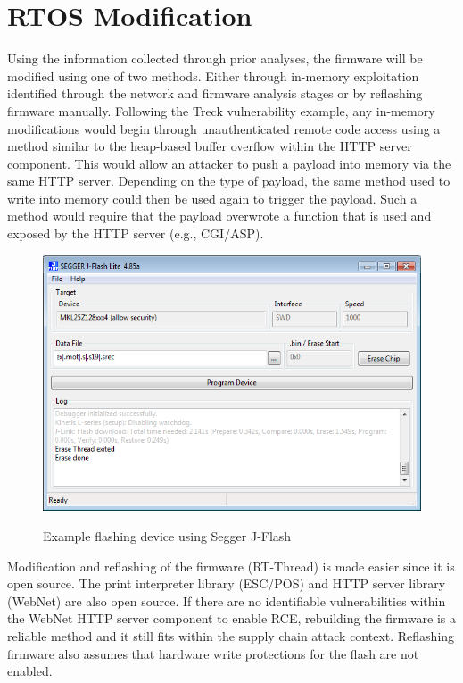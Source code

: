 \section{RTOS Modification} \label{rtosmodification}

Using the information collected through prior analyses, the firmware will be modified using one of two methods. Either through in-memory exploitation identified through the network and firmware analysis stages or by reflashing firmware manually. Following the Treck vulnerability example, any in-memory modifications would begin through unauthenticated remote code access using a method similar to the heap-based buffer overflow within the HTTP server component. This would allow an attacker to push a payload into memory via the same HTTP server. Depending on the type of payload, the same method used to write into memory could then be used again to trigger the payload. Such a method would require that the payload overwrote a function that is used and exposed by the HTTP server (e.g., CGI/ASP).

\begin{figure}[!htb]%
    \centering
    {\includegraphics[width=160mm,scale=1]{Figures/j-flash-lite.png}}
    \caption{Example flashing device using Segger J-Flash \autocite{JLinkFlashDownload}}%
    \label{fig:jlink_flash}%
\end{figure}

Modification and reflashing of the firmware (RT-Thread) is made easier since it is open source. The print interpreter library (ESC/POS) and HTTP server library (WebNet) are also open source. If there are no identifiable vulnerabilities within the WebNet HTTP server component to enable RCE, rebuilding the firmware is a reliable method and it still fits within the supply chain attack context. Reflashing firmware also assumes that hardware write protections for the flash are not enabled.
